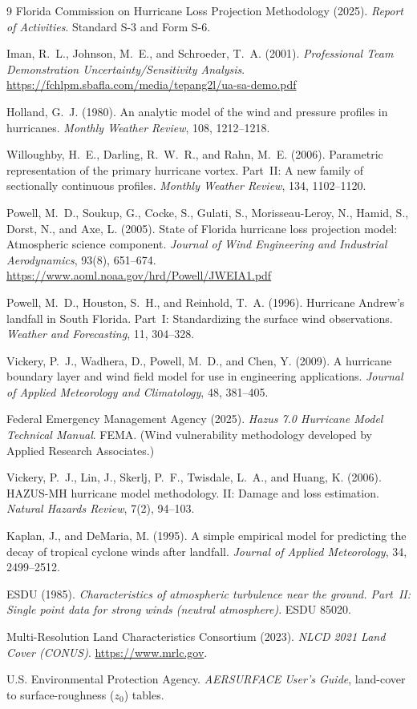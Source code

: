 \documentclass[11pt]{article}
\begin{document}
\begin{thebibliography}{9}
 Florida Commission on Hurricane Loss Projection Methodology (2025).
\emph{Report of Activities}. Standard S-3 and Form S-6.

 Iman, R.~L., Johnson, M.~E., and Schroeder, T.~A. (2001).
\emph{Professional Team Demonstration Uncertainty/Sensitivity Analysis}.
\url{https://fchlpm.sbafla.com/media/tepang2l/ua-sa-demo.pdf}

 Holland, G.~J. (1980). An analytic model of the wind and pressure
profiles in hurricanes. \emph{Monthly Weather Review}, 108, 1212--1218.

 Willoughby, H.~E., Darling, R.~W.~R., and Rahn, M.~E. (2006).
Parametric representation of the primary hurricane vortex. Part~II: A new family of
sectionally continuous profiles. \emph{Monthly Weather Review}, 134, 1102--1120.

 Powell, M.~D., Soukup, G., Cocke, S., Gulati, S.,
Morisseau-Leroy, N., Hamid, S., Dorst, N., and Axe, L. (2005). State of Florida
hurricane loss projection model: Atmospheric science component.
\emph{Journal of Wind Engineering and Industrial Aerodynamics}, 93(8), 651--674.
\url{https://www.aoml.noaa.gov/hrd/Powell/JWEIA1.pdf}

 Powell, M.~D., Houston, S.~H., and Reinhold, T.~A. (1996).
Hurricane Andrew's landfall in South Florida. Part~I: Standardizing the surface
wind observations. \emph{Weather and Forecasting}, 11, 304--328.

 Vickery, P.~J., Wadhera, D., Powell, M.~D., and Chen, Y. (2009).
A hurricane boundary layer and wind field model for use in engineering applications.
\emph{Journal of Applied Meteorology and Climatology}, 48, 381--405.

 Federal Emergency Management Agency (2025). \emph{Hazus 7.0
Hurricane Model Technical Manual}. FEMA. (Wind vulnerability methodology developed
by Applied Research Associates.)

 Vickery, P.~J., Lin, J., Skerlj, P.~F., Twisdale, L.~A.,
and Huang, K. (2006). HAZUS-MH hurricane model methodology. II: Damage and loss
estimation. \emph{Natural Hazards Review}, 7(2), 94--103.

 Kaplan, J., and DeMaria, M. (1995). A simple empirical model for
predicting the decay of tropical cyclone winds after landfall.
\emph{Journal of Applied Meteorology}, 34, 2499--2512.

 ESDU (1985). \emph{Characteristics of atmospheric turbulence near the
ground. Part~II: Single point data for strong winds (neutral atmosphere)}. ESDU 85020.

 Multi-Resolution Land Characteristics Consortium (2023).
\emph{NLCD 2021 Land Cover (CONUS)}. \url{https://www.mrlc.gov}.

 U.S. Environmental Protection Agency.
\emph{AERSURFACE User's Guide}, land-cover to surface-roughness ($z_0$) tables.
\end{thebibliography}
\end{document}
